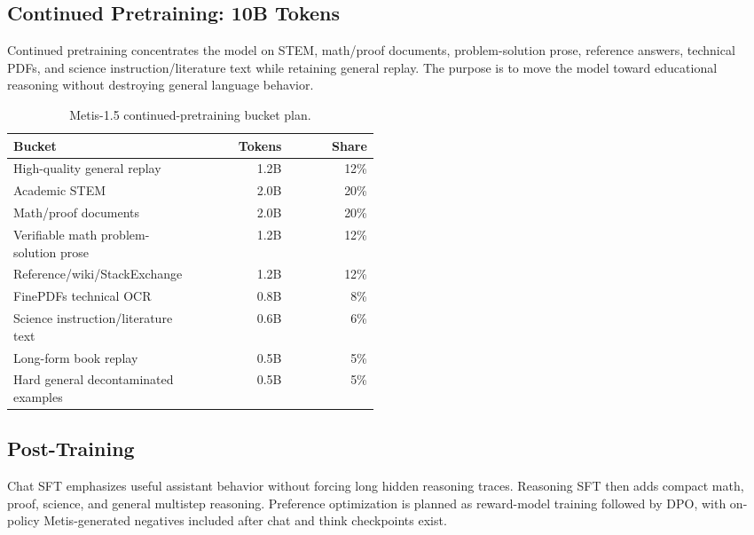 \documentclass[11pt]{article}
\begin{document}
\subsection{Continued Pretraining: 10B Tokens}

Continued pretraining concentrates the model on STEM, math/proof documents,
problem-solution prose, reference answers, technical PDFs, and science
instruction/literature text while retaining general replay. The purpose is to
move the model toward educational reasoning without destroying general language
behavior.

\begin{table}[h]
\centering
\begin{tabular}{p{0.48\linewidth}r r}
\toprule
Bucket & Tokens & Share \\
\midrule
High-quality general replay & 1.2B & 12\% \\
Academic STEM & 2.0B & 20\% \\
Math/proof documents & 2.0B & 20\% \\
Verifiable math problem-solution prose & 1.2B & 12\% \\
Reference/wiki/StackExchange & 1.2B & 12\% \\
FinePDFs technical OCR & 0.8B & 8\% \\
Science instruction/literature text & 0.6B & 6\% \\
Long-form book replay & 0.5B & 5\% \\
Hard general decontaminated examples & 0.5B & 5\% \\
\bottomrule
\end{tabular}
\caption{Metis-1.5 continued-pretraining bucket plan.}
\label{tab:cpt_buckets}
\end{table}

\subsection{Post-Training}

Chat SFT emphasizes useful assistant behavior without forcing long hidden
reasoning traces. Reasoning SFT then adds compact math, proof, science, and
general multistep reasoning. Preference optimization is planned as reward-model
training followed by DPO, with on-policy Metis-generated negatives included
after chat and think checkpoints exist.
\end{document}
